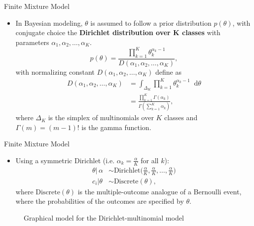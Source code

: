 \documentclass[aspectratio=169,xcolor=dvipsnames]{beamer}
\newcommand*\diff{\mathop{}\!\mathrm{d}}
\newcommand{\aOverK}{\frac{\alpha}{K}}
\begin{document}
\begin{frame}{Finite Mixture Model}
\setlength{\leftmargini}{0.2cm}
\begin{itemize}
\item In Bayesian modeling, $\theta$ is assumed to follow a prior distribution $p(\theta)$, with conjugate choice the \textbf{Dirichlet distribution over K classes} with parameters $\alpha_1,\alpha_2,\dots,\alpha_K$.
\begin{equation*}
    p(\theta) = \frac{\prod_{k=1}^{K}\theta^{\alpha_k-1}_{k}}{D(\alpha_1,\alpha_2,\dots,\alpha_K)},
\end{equation*}
with normalizing constant $D(\alpha_1,\alpha_2,\dots,\alpha_K)$ define as
\begin{align*}
    D(\alpha_1,\alpha_2,\dots,\alpha_K) &= \int_{\Delta_{K}} \prod_{k=1}^{K}\theta^{\alpha_k-1}_{k} \diff \theta \\ &= \frac{\prod_{k=1}^{K} \Gamma(\alpha_{k})}{\Gamma(\sum_{k=1}^{K}\alpha_{k})},
\end{align*}
where $\Delta_K$ is the simplex of multinomials over $K$ classes  and $\Gamma(m) = (m - 1)!$ is the gamma function.
\end{itemize}
\end{frame}
\begin{frame}{Finite Mixture Model}
\setlength{\leftmargini}{0.2cm}
\begin{itemize}
\item Using a symmetric Dirichlet (i.e. $\alpha_k = \aOverK$ for all $k$):
\begin{align*}
    \theta | \, \alpha &\sim \text{Dirichlet}\Big(\aOverK, \aOverK, \dots, \aOverK\Big) \\ c_i | \theta & \sim \text{Discrete}(\theta),
\end{align*}
where $\text{Discrete}(\theta)$ is the multiple-outcome analogue of a Bernoulli event, where the probabilities of the outcomes are specified by $\theta$.
\end{itemize}
\vspace{1pt}
\pause
\begin{figure}
\begin{center} 
\caption{Graphical model for the Dirichlet-multinomial model}
\label{fig:dirichlet_mult}
\end{center}
\end{figure}
\end{frame}
\end{document}
